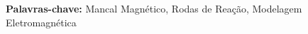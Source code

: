 \par
\vspace{1em}
\noindent\textbf{Palavras-chave:} Mancal Magnético, Rodas de Reação, Modelagem Eletromagnética
\newpage
%
%


\newpage


\listoffigures

\listoftables

\printnomenclature

\tableofcontents

